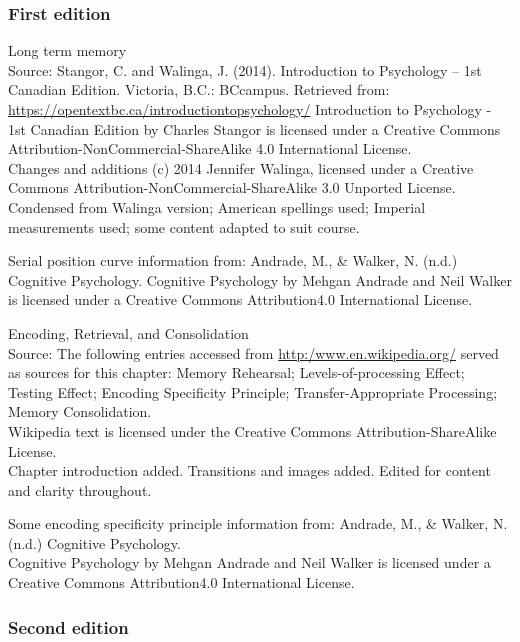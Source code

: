 \documentclass[
]{krantz}
\begin{document}
\subsubsection*{First edition}\label{first-edition-5}


Long term memory\\
Source: Stangor, C. and Walinga, J. (2014). Introduction to Psychology -- 1st Canadian Edition. Victoria, B.C.: BCcampus. Retrieved from: \url{https://opentextbc.ca/introductiontopsychology/}
Introduction to Psychology - 1st Canadian Edition by Charles Stangor is licensed under a Creative Commons Attribution-NonCommercial-ShareAlike 4.0 International License.\\
Changes and additions (c) 2014 Jennifer Walinga, licensed under a Creative Commons Attribution-NonCommercial-ShareAlike 3.0 Unported License.\\
Condensed from Walinga version; American spellings used; Imperial measurements used; some content adapted to suit course.

Serial position curve information from: Andrade, M., \& Walker, N. (n.d.) Cognitive Psychology.
Cognitive Psychology by Mehgan Andrade and Neil Walker is licensed under a Creative Commons Attribution4.0 International License.

Encoding, Retrieval, and Consolidation\\
Source: The following entries accessed from \url{http:/www.en.wikipedia.org/} served as sources for this chapter: Memory Rehearsal; Levels-of-processing Effect; Testing Effect; Encoding Specificity Principle; Transfer-Appropriate Processing; Memory Consolidation.\\
Wikipedia text is licensed under the Creative Commons Attribution-ShareAlike License.\\
Chapter introduction added. Transitions and images added. Edited for content and clarity throughout.

Some encoding specificity principle information from: Andrade, M., \& Walker, N. (n.d.) Cognitive Psychology.\\
Cognitive Psychology by Mehgan Andrade and Neil Walker is licensed under a Creative Commons Attribution4.0 International License.\\

\subsubsection*{Second edition}\label{second-edition-5}
\end{document}
